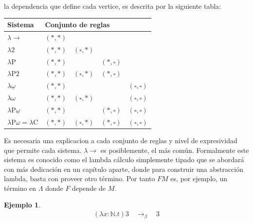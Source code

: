 \documentclass[a4paper,12pt]{report}
\theoremstyle{definition}
\newtheorem{example}{Ejemplo}[chapter]
\theoremstyle{plain}
\theoremstyle{remark}
\begin{document}
la dependencia que define cada vertice, es descrita por la siguiente tabla:
\newline
\begin{center}
\begin{tabular}{|l|llll|}
\hline
Sistema & \multicolumn{4}{l|}{Conjunto de reglas} \\
\hline
$\lambda{\rightarrow}$                       & $(\ast,\ast)$ &                 &                 &                     \\
$\lambda 2$                                   & $(\ast,\ast)$ & $(\square,\ast)$ &                 &                     \\
$\lambda\mathrm{P}$                           & $(\ast,\ast)$ &                 & $(\ast,\square)$ &                     \\
$\lambda\mathrm{P}2$                          & $(\ast,\ast)$ & $(\square,\ast)$ & $(\ast,\square)$ &                     \\
$\lambda\underline{\omega}$                   & $(\ast,\ast)$ &                 &                 & $(\square,\square)$ \\
$\lambda\omega$                               & $(\ast,\ast)$ & $(\square,\ast)$ &                 & $(\square,\square)$ \\
$\lambda\mathrm{P}\underline{\omega}$         & $(\ast,\ast)$ &                 & $(\ast,\square)$ & $(\square,\square)$ \\
$\lambda\mathrm{P}\omega = \lambda\mathrm{C}$ & $(\ast,\ast)$ & $(\square,\ast)$ & $(\ast,\square)$ & $(\square,\square)$ \\
\hline
\end{tabular}
\end{center}
\medskip

\indent Es necesaria una explicacion a cada conjunto de reglas y nivel de expresividad que permite cada sistema. $\lambda\to$ es posiblemente, el más común. Formalmente este sistema es conocido como el lambda cálculo simplemente tipado que se abordará con más dedicación en un capítulo aparte, donde para construir una abstracción lambda, basta con proveer otro término. Por tanto $FM$ es, por ejemplo, un término en $\Lambda$ donde $F$ depende de $M$.
\begin{example}
\begin{align}
(\lambda x : \mathbb{N} . t) 3
\quad \longrightarrow_\beta \quad 3
\end{align}
\end{example}
\end{document}
